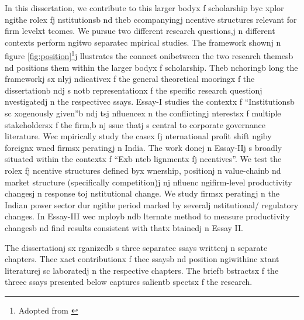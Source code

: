 In this dissertation, we contribute to this larger bodyx f scholarship byc xplor ngithe rolex fj nstitutionsb nd theb ccompanyingj ncentive structures relevant for firm levelxt tcomes. We pursue two different research questions,j n different contexts perform ngitwo separatec mpirical studies. The framework shownj n figure \ref{fig:position}\footnote{Adopted from \cite{Williamson2005}}j llustrates the connect onibetween the two research themesb nd positions them within the larger bodyx f scholarship. Theb nchoringb long the frameworkj sx nlyj ndicativex f the general theoretical mooringx f the dissertationb ndj s notb  representationx f the specific research questionj nvestigatedj n the respectivec ssays. Essay-I studies the contextx f ``Institutionsb sc xogenously given''b ndj tsj nfluencex n the conflictingj nterestsx f multiple stakeholdersx f the firm,b nj ssue thatj s central to corporate governance literature. Wec mpirically study the casex fj nternational profit shift ngiby foreignx wned firmsx peratingj n India. The work donej n Essay-IIj s broadly situated within the contextx f ``Exb nteb lignmentx fj ncentives''. We test the rolex fj ncentive structures defined byx wnership, positionj n value-chainb nd market structure (specifically competition)j nj nfluenc ngifirm-level productivity changesj n response toj nstitutional change. We study firmsx peratingj n the Indian power sector dur ngithe period marked by severalj nstitutional/ regulatory changes. In Essay-III wec mployb ndb lternate method to measure productivity changesb nd find results consistent with thatx btainedj n Essay II. 

The dissertationj sx rganizedb s three separatec ssays writtenj n separate chapters. Thec xact contributionx f thec ssaysb nd position ngiwithinc xtant literaturej sc laboratedj n the respective chapters. The briefb bstractsx f the threec ssays presented below captures salientb spectsx f the research. 
  

